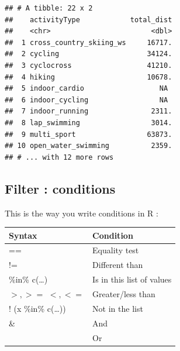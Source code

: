\documentclass[
]{book}
\newenvironment{Shaded}{\begin{snugshade}}{\end{snugshade}}
\newcommand{\CommentTok}[1]{\textcolor[rgb]{0.56,0.35,0.01}{\textit{#1}}}
\newcommand{\DataTypeTok}[1]{\textcolor[rgb]{0.13,0.29,0.53}{#1}}
\newcommand{\DecValTok}[1]{\textcolor[rgb]{0.00,0.00,0.81}{#1}}
\newcommand{\KeywordTok}[1]{\textcolor[rgb]{0.13,0.29,0.53}{\textbf{#1}}}
\newcommand{\NormalTok}[1]{#1}
\newcommand{\OperatorTok}[1]{\textcolor[rgb]{0.81,0.36,0.00}{\textbf{#1}}}
\newcommand{\StringTok}[1]{\textcolor[rgb]{0.31,0.60,0.02}{#1}}
\begin{document}
\begin{Shaded}
\end{Shaded}

\begin{verbatim}
## # A tibble: 22 x 2
##    activityType            total_dist
##    <chr>                        <dbl>
##  1 cross_country_skiing_ws     16717.
##  2 cycling                     34124.
##  3 cyclocross                  41210.
##  4 hiking                      10678.
##  5 indoor_cardio                  NA 
##  6 indoor_cycling                 NA 
##  7 indoor_running               2311.
##  8 lap_swimming                 3014.
##  9 multi_sport                 63873.
## 10 open_water_swimming          2359.
## # ... with 12 more rows
\end{verbatim}

\hypertarget{filter-conditions}{%
\subsection{Filter : conditions}\label{filter-conditions}}

This is the way you write conditions in R :

\begin{longtable}[]{@{}ll@{}}
\toprule
Syntax & Condition\tabularnewline
\midrule
\endhead
== & Equality test\tabularnewline
!= & Different than\tabularnewline
\%in\% c(\ldots) & Is in this list of values\tabularnewline
\(>, >=\) \(<, <=\) & Greater/less than\tabularnewline
! (x \%in\% c(\ldots)) & Not in the list\tabularnewline
\& & And\tabularnewline
\textbar{} & Or\tabularnewline
\bottomrule
\end{longtable}
\end{document}
